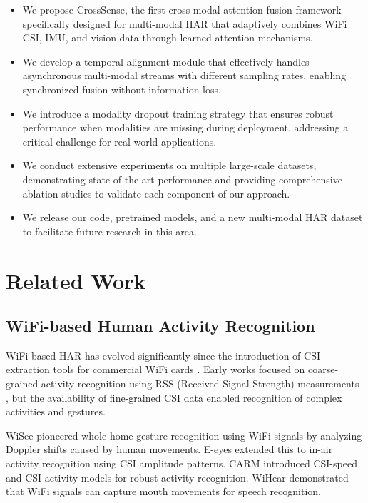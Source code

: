 \documentclass[10pt,twocolumn]{article}
\begin{document}
\begin{itemize}
\item We propose CrossSense, the first cross-modal attention fusion framework specifically designed for multi-modal HAR that adaptively combines WiFi CSI, IMU, and vision data through learned attention mechanisms.

\item We develop a temporal alignment module that effectively handles asynchronous multi-modal streams with different sampling rates, enabling synchronized fusion without information loss.

\item We introduce a modality dropout training strategy that ensures robust performance when modalities are missing during deployment, addressing a critical challenge for real-world applications.

\item We conduct extensive experiments on multiple large-scale datasets, demonstrating state-of-the-art performance and providing comprehensive ablation studies to validate each component of our approach.

\item We release our code, pretrained models, and a new multi-modal HAR dataset to facilitate future research in this area.
\end{itemize}

\section{Related Work}

\subsection{WiFi-based Human Activity Recognition}

WiFi-based HAR has evolved significantly since the introduction of CSI extraction tools for commercial WiFi cards \cite{halperin2011tool}. Early works focused on coarse-grained activity recognition using RSS (Received Signal Strength) measurements \cite{sigg2014rf}, but the availability of fine-grained CSI data enabled recognition of complex activities and gestures.

WiSee \cite{pu2013whole} pioneered whole-home gesture recognition using WiFi signals by analyzing Doppler shifts caused by human movements. E-eyes \cite{wang2014eyes} extended this to in-air activity recognition using CSI amplitude patterns. CARM \cite{wang2015carm} introduced CSI-speed and CSI-activity models for robust activity recognition. WiHear \cite{wang2016wihear} demonstrated that WiFi signals can capture mouth movements for speech recognition.
\end{document}
